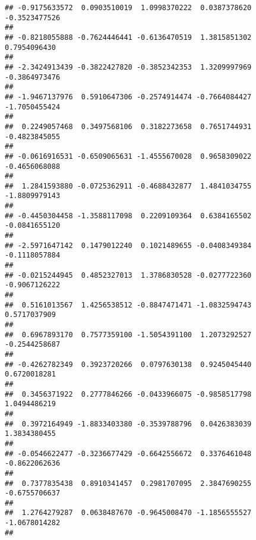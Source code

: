 \documentclass[]{article}
\begin{document}
\begin{verbatim}
## -0.9175633572  0.0903510019  1.0998370222  0.0387378620 -0.3523477526 
##                                                                       
## -0.8218055888 -0.7624446441 -0.6136470519  1.3815851302  0.7954096430 
##                                                                       
## -2.3424913439 -0.3822427820 -0.3852342353  1.3209997969 -0.3864973476 
##                                                                       
## -1.9467137976  0.5910647306 -0.2574914474 -0.7664084427 -1.7050455424 
##                                                                       
##  0.2249057468  0.3497568106  0.3182273658  0.7651744931 -0.4823845055 
##                                                                       
## -0.0616916531 -0.6509065631 -1.4555670028  0.9658309022 -0.4656068088 
##                                                                       
##  1.2841593880 -0.0725362911 -0.4688432877  1.4841034755 -1.8809979143 
##                                                                       
## -0.4450304458 -1.3588117098  0.2209109364  0.6384165502 -0.0841655120 
##                                                                       
## -2.5971647142  0.1479012240  0.1021489655 -0.0408349384 -0.1118057884 
##                                                                       
## -0.0215244945  0.4852327013  1.3786830528 -0.0277722360 -0.9067126222 
##                                                                       
##  0.5161013567  1.4256538512 -0.8847471471 -1.0832594743  0.5717037909 
##                                                                       
##  0.6967893170  0.7577359100 -1.5054391100  1.2073292527 -0.2544258687 
##                                                                       
## -0.4262782349  0.3923720266  0.0797630138  0.9245045440  0.6720018281 
##                                                                       
##  0.3456371922  0.2777846266 -0.0433966075 -0.9858517798  1.0494486219 
##                                                                       
##  0.3972164949 -1.8833403380 -0.3539788796  0.0426383039  1.3834380455 
##                                                                       
## -0.0546622477 -0.3236677429 -0.6642556672  0.3376461048 -0.8622062636 
##                                                                       
##  0.7377835438  0.8910341457  0.2981707095  2.3847690255 -0.6755706637 
##                                                                       
##  1.2764279287  0.0638487670 -0.9645008470 -1.1856555527 -1.0678014282 
##                                                                       

\end{verbatim}
\end{document}

